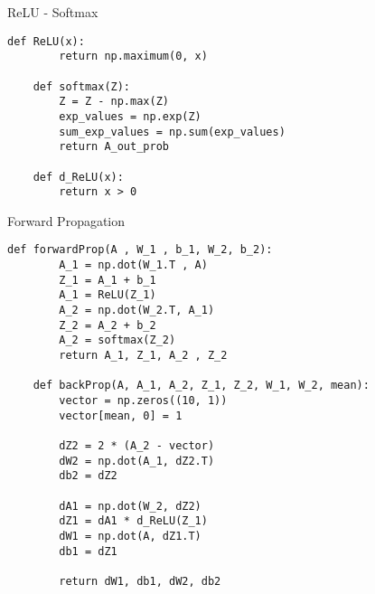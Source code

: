 \documentclass[a4paper,12pt]{article}
\begin{document}
    \begin{algorithm}[H]
    \caption{ReLU - Softmax}
    \begin{lstlisting}[style=pythonstyle]
    def ReLU(x):
        return np.maximum(0, x)
    
    def softmax(Z):
        Z = Z - np.max(Z)  
        exp_values = np.exp(Z)
        sum_exp_values = np.sum(exp_values)
        return A_out_prob
    
    def d_ReLU(x):
        return x > 0
    \end{lstlisting}
    \end{algorithm}
    
    
    \begin{algorithm}[H]
    \caption{Forward Propagation}
    \begin{lstlisting}[style=pythonstyle]
    def forwardProp(A , W_1 , b_1, W_2, b_2):
        A_1 = np.dot(W_1.T , A)
        Z_1 = A_1 + b_1
        A_1 = ReLU(Z_1)
        A_2 = np.dot(W_2.T, A_1)
        Z_2 = A_2 + b_2
        A_2 = softmax(Z_2)
        return A_1, Z_1, A_2 , Z_2
    
    def backProp(A, A_1, A_2, Z_1, Z_2, W_1, W_2, mean):
        vector = np.zeros((10, 1))
        vector[mean, 0] = 1
    
        dZ2 = 2 * (A_2 - vector) 
        dW2 = np.dot(A_1, dZ2.T)
        db2 = dZ2
    
        dA1 = np.dot(W_2, dZ2) 
        dZ1 = dA1 * d_ReLU(Z_1) 
        dW1 = np.dot(A, dZ1.T) 
        db1 = dZ1
    
        return dW1, db1, dW2, db2
    \end{lstlisting}
    \end{algorithm}
    
\end{document}
